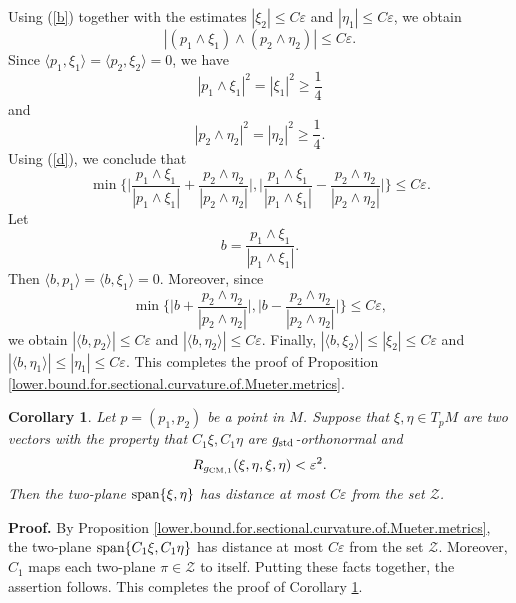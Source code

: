 \documentclass[11pt]{amsart}
\newtheorem{corollary}[theorem]{Corollary}
\theoremstyle{definition}
\begin{document}
Using (\ref{b}) together with the estimates $|\xi_2| \leq C\varepsilon$ and $|\eta_1| \leq C\varepsilon$, we obtain 
\begin{equation}
\label{d}
|(p_1 \wedge \xi_1) \wedge (p_2 \wedge \eta_2)| \leq C\varepsilon. 
\end{equation}
Since $\langle p_1,\xi_1 \rangle = \langle p_2,\xi_2 \rangle = 0$, we have 
\[|p_1 \wedge \xi_1|^2 = |\xi_1|^2 \geq \frac{1}{4}\] 
and 
\[|p_2 \wedge \eta_2|^2 = |\eta_2|^2 \geq \frac{1}{4}.\]
Using (\ref{d}), we conclude that 
\[\min \Big \{ \Big | \frac{p_1 \wedge \xi_1}{|p_1 \wedge \xi_1|} + \frac{p_2 \wedge \eta_2}{|p_2 \wedge \eta_2|} \Big |,\Big | \frac{p_1 \wedge \xi_1}{|p_1 \wedge \xi_1|} - \frac{p_2 \wedge \eta_2}{|p_2 \wedge \eta_2|} \Big | \Big \} \leq C\varepsilon.\] 
Let 
\[b = \frac{p_1 \wedge \xi_1}{|p_1 \wedge \xi_1|}.\] 
Then $\langle b,p_1 \rangle = \langle b,\xi_1 \rangle = 0$. Moreover, since 
\[\min \Big \{ \Big | b + \frac{p_2 \wedge \eta_2}{|p_2 \wedge \eta_2|} \Big |,\Big | b - \frac{p_2 \wedge \eta_2}{|p_2 \wedge \eta_2|} \Big | \Big \} \leq C\varepsilon,\] 
we obtain $|\langle b,p_2 \rangle| \leq C\varepsilon$ and $|\langle b,\eta_2 \rangle| \leq C\varepsilon$. Finally, $|\langle b,\xi_2 \rangle| \leq |\xi_2| \leq C\varepsilon$ and $|\langle b,\eta_1 \rangle| \leq |\eta_1| \leq C\varepsilon$. This completes the proof of Proposition \ref{lower.bound.for.sectional.curvature.of.Mueter.metrics}. \\


\begin{corollary} 
\label{lower.bound.for.sectional.curvature.of.Mueter.metrics.2}
Let $p = (p_1,p_2)$ be a point in $M$. Suppose that $\xi,\eta \in T_p M$ are two vectors with the property that $C_1\xi,C_1\eta$ are $g_{\text{\rm std}}$-orthonormal and 
\[R_{g_{\text{\rm CM},1}}(\xi,\eta,\xi,\eta) < \varepsilon^2.\] 
Then the two-plane $\text{\rm span}\{\xi,\eta\}$ has distance at most $C\varepsilon$ from the set $\mathcal{Z}$.
\end{corollary}

\textbf{Proof.}
By Proposition \ref{lower.bound.for.sectional.curvature.of.Mueter.metrics}, the two-plane $\text{\rm span}\{C_1 \xi,C_1 \eta\}$ has distance at most $C\varepsilon$ from the set $\mathcal{Z}$. Moreover, $C_1$ maps each two-plane $\pi \in \mathcal{Z}$ to itself. Putting these facts together, the assertion follows. This completes the proof of Corollary \ref{lower.bound.for.sectional.curvature.of.Mueter.metrics.2}. \\
\end{document}
